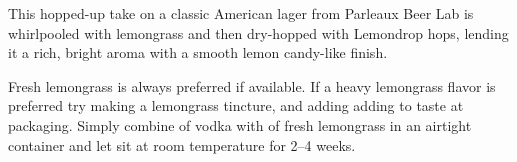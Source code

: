 \documentclass[10pt,oneside]{scrbook}
\begin{document}
\begin{aboutblock}
This hopped-up take on a classic American lager from Parleaux Beer Lab is whirlpooled
with lemongrass and then dry-hopped with Lemondrop hops, lending it a rich, bright aroma
with a smooth lemon candy-like finish.
\end{aboutblock}


\begin{methodandtiming}
  
\begin{mashsteps}
\end{mashsteps}

\begin{fermentationsteps}
\end{fermentationsteps}

\begin{directions}
Fresh lemongrass is always preferred if available. If a heavy lemongrass flavor is preferred
try making a lemongrass tincture, and adding adding to taste at packaging. Simply combine
 of vodka with  of fresh lemongrass in an airtight container and let sit at
room temperature for 2--4 weeks.
\end{directions}

\end{methodandtiming}

\pagebreak

\begin{ingredientsblock}

\begin{malts}
\end{malts}

\begin{hops}
\end{hops}

\begin{yeasts}
\end{yeasts}

\end{ingredientsblock}
\end{document}

